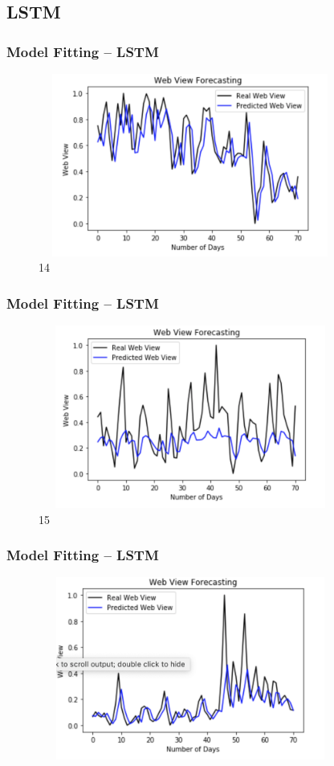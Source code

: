 \documentclass[cjk,10pt]{beamer}
\begin{document}
\begin{CJK*}{GBK}{song}
    \subsection{LSTM}
 \begin{frame}
    \frametitle{Model Fitting -- LSTM}
    \begin{figure}[htbp]
\centering
\includegraphics[height=6cm, width=10cm]{14}
\caption{14}
\end{figure}
       \end{frame}    
  \begin{frame}
    \frametitle{Model Fitting -- LSTM}
    \begin{figure}[htbp]
\centering
\includegraphics[height=6cm, width=10cm]{15}
\caption{15}
\end{figure}
       \end{frame}       
     \begin{frame}
    \frametitle{Model Fitting -- LSTM}
    \begin{figure}[htbp]
\centering
\includegraphics[height=6cm, width=10cm]{16}

\end{figure}
\end{frame}
\end{CJK*}
\end{document}
